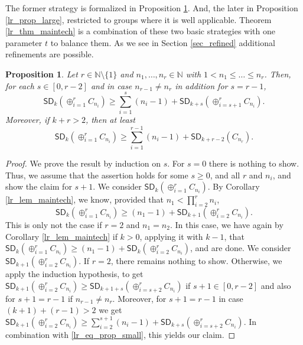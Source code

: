 \documentclass{amsart}
\newtheorem{pro}[thm]{Proposition}
\theoremstyle{definition}
\numberwithin{equation}{section}
\begin{document}
The former strategy is formalized in Proposition \ref{lr_prop_small}. And, the later in Proposition \ref{lr_prop_large}, restricted to groups where it is well applicable. Theorem \ref{lr_thm_maintech} is a combination of these two basic strategies with one parameter $t$ to balance them.
As we see in Section \ref{sec_refined} additional refinements are possible.

\begin{pro}
\label{lr_prop_small}
Let $r\in \mathbb{N}\setminus \{1\}$ and $n_1, \dots , n_r \in \mathbb{N}$ with $1< n_1 \le \dots \le n_r$.
Then, for each $s\in [0, r-2]$ and in case $n_{r-1}\neq n_r$ in addition for $s=r-1$,
\[{\mathsf{SD}}_k(\oplus_{i=1}^{r}C_{n_i}) \ge \sum_{i=1}^s (n_i -1)+ {\mathsf{SD}}_{k+s}(\oplus_{i=s +1}^r C_{n_i}).\]
Moreover, if $k+r >2$, then at least
\[{\mathsf{SD}}_k(\oplus_{i=1}^{r}C_{n_i}) \ge \sum_{i=1}^{r-1} (n_i -1)+ {\mathsf{SD}}_{k+r-2}( C_{n_r}).\]
\end{pro}
\begin{proof}
We prove the result by induction on $s$.
For $s=0$ there is nothing to show.
Thus, we assume that the assertion holds for some $s\ge 0$, and all $r$ and $n_i$, and show the claim for $s+1$.
We consider ${\mathsf{SD}}_k(\oplus_{i=1}^{r} C_{n_i})$. By Corollary \ref{lr_lem_maintech}, we
know, provided that $n_1 < \prod_{i=2}^{r}n_i$,
\begin{equation}
\label{lr_eq_prop_small}
{\mathsf{SD}}_k(\oplus_{i=1}^{r} C_{n_i}) \ge (n_1 - 1) + {\mathsf{SD}}_{k+1}(\oplus_{i=2}^{r} C_{n_i}).\end{equation}
This is only not the case if $r=2$ and $n_1 = n_2$.
In this case, we have again by Corollary \ref{lr_lem_maintech} if $k>0$, applying it with $k-1$, that
${\mathsf{SD}}_k(\oplus_{i=1}^{r} C_{n_i}) \ge (n_1 - 1) + {\mathsf{SD}}_{k}(\oplus_{i=2}^{r} C_{n_i}) $, and are done.
We consider ${\mathsf{SD}}_{k+1}(\oplus_{i=2}^{r} C_{n_i})$. If $r=2$, there remains nothing to show. Otherwise, we apply the induction hypothesis, to get
${\mathsf{SD}}_{k+1}(\oplus_{i=2}^{r} C_{n_i})\ge {\mathsf{SD}}_{k+1 + s}(\oplus_{i=s+2}^{r} C_{n_i})$
if $s+1 \in [0,r-2]$ and also for $s+1 = r-1$ if $n_{r-1}\neq n_r$. Moreover, for $s+1=r-1$ in case $(k+1)+(r-1)>2$ we get ${\mathsf{SD}}_{k+1}(\oplus_{i=2}^{r} C_{n_i})\ge \sum_{i=2}^{s+1}(n_i - 1) + {\mathsf{SD}}_{k+s}(\oplus_{i=s+2}^{r} C_{n_i})$.
In combination with \eqref{lr_eq_prop_small}, this yields our claim.
\end{proof}
\end{document}
